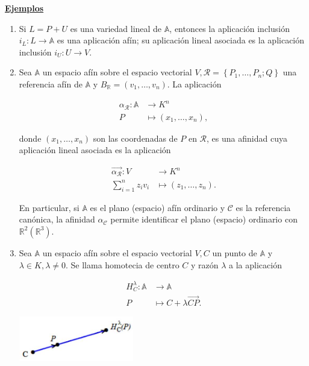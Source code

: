 \documentclass[12pt, a4paper, ones, notitlepage, openany,titlepage]{article}
\newcommand{\ejemplos}{\noindent\underline{\textbf{Ejemplos}}}
\begin{document}
\ejemplos
\begin{enumerate}
\item Si $L=P+U$ es una variedad lineal de $\mathbb{A}$, entonces la aplicación inclusión $i_{L}: L \rightarrow \mathbb{A}$ es una aplicación afín; su aplicación lineal asociada es la aplicación inclusión $i_{U}: U \rightarrow V$.

\item Sea $\mathbb{A}$ un espacio afín sobre el espacio vectorial $V, \mathcal{R}=\left\{P_{1}, \ldots, P_{n} ; Q\right\}$ una referencia afín de $\mathbb{A}$ y $B_{\mathbb{R}}=\left(v_{1}, \ldots, v_{n}\right)$. La aplicación

$$
\begin{aligned}
\alpha_{\mathcal{R}}: \mathbb{A} & \longrightarrow K^{n} \\
P & \longmapsto\left(x_{1}, \ldots, x_{n}\right),
\end{aligned}
$$

donde $\left(x_{1}, \ldots, x_{n}\right)$ son las coordenadas de $P$ en $\mathcal{R}$, es una afinidad cuya aplicación lineal asociada es la aplicación

$$
\begin{aligned}
\overrightarrow{\alpha_{\mathcal{R}}}: V & \longrightarrow K^{n} \\
\sum_{i=1}^{n} z_{i} v_{i} & \longmapsto\left(z_{1}, \ldots, z_{n}\right) .
\end{aligned}
$$

En particular, si $\mathbb{A}$ es el plano (espacio) afín ordinario y $\mathcal{C}$ es la referencia canónica, la afinidad $\alpha_{\mathcal{C}}$ permite identificar el plano (espacio) ordinario con $\mathbb{R}^{2}\left(\mathbb{R}^{3}\right)$.

\item Sea $\mathbb{A}$ un espacio afín sobre el espacio vectorial $V, C$ un punto de $\mathbb{A}$ y $\lambda \in K, \lambda \neq 0$. Se llama homotecia de centro $C$ y razón $\lambda$ a la aplicación

$$
\begin{aligned}
H_{C}^{\lambda}: \mathbb{A} & \longrightarrow \mathbb{A} \\
P & \longmapsto C+\lambda \overrightarrow{C P} .
\end{aligned}
$$

\begin{center}
\includegraphics[max width=5cm]{2023_03_01_7659aec5e35f9a9b2d3cg-25}
\end{center}


\end{enumerate}
\end{document}
